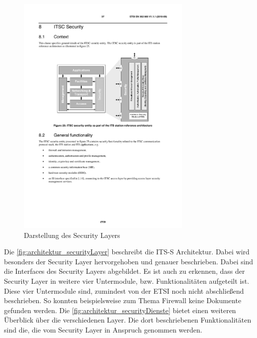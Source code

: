 \begin{figure}
	\includegraphics[width=0.75\textwidth]{content/images/02_architektur/securityLayer.pdf}
	\caption{Darstellung des Security Layers \cite{en302665}}
	\label{fig:architektur_securityLayer}
\end{figure}


Die \autoref{fig:architektur_securityLayer}  beschreibt die \ac{ITS-S} Architektur. Dabei wird besonders der Security Layer hervorgehoben und genauer beschrieben. Dabei sind die Interfaces des Security Layers abgebildet. Es ist auch zu erkennen, dass der Security Layer in weitere vier Untermodule, bzw. Funktionalitäten aufgeteilt ist. Diese vier Untermodule sind, zumindest von der \ac{ETSI} noch nicht abschließend beschrieben. So konnten beispielsweise zum Thema Firewall keine Dokumente gefunden werden. Die \autoref{fig:architektur_securityDienste} bietet einen weiteren Überblick über die verschiedenen Layer. Die dort beschriebenen Funktionalitäten sind die, die vom Security Layer in Anspruch genommen werden.  

